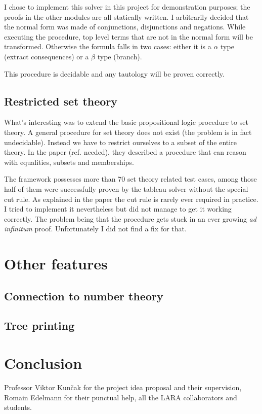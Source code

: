 \documentclass[acmlarge]{acmart}
\begin{document}
I chose to implement this solver in this project for demonstration purposes; the proofs in the other modules are all statically written. I arbitrarily decided that the normal form was made of conjunctions, disjunctions and negations. While executing the procedure, top level terms that are not in the normal form will be transformed. Otherwise the formula falls in two cases: either it is a $\alpha$ type (extract consequences) or a $\beta$ type (branch).

This procedure is decidable and any tautology will be proven correctly.

\subsection{Restricted set theory}

What's interesting was to extend the basic propositional logic procedure to set theory. A general procedure for set theory does not exist (the problem is in fact undecidable). Instead we have to restrict ourselves to a subset of the entire theory. In the paper (ref. needed), they described a procedure that can reason with equalities, subsets and memberships.

The framework possesses more than 70 set theory related test cases, among those half of them were successfully proven by the tableau solver without the special cut rule. As explained in the paper the cut rule is rarely ever required in practice. I tried to implement it nevertheless but did not manage to get it working correctly. The problem being that the procedure gets stuck in an ever growing \emph{ad infinitum} proof. Unfortunately I did not find a fix for that.

\section{Other features}

\subsection{Connection to number theory}

\subsection{Tree printing}

\section{Conclusion}


\begin{acks}
Professor Viktor Kunčak for the project idea proposal and their supervision, Romain Edelmann for their punctual help, all the LARA collaborators and students.
\end{acks}
\end{document}
